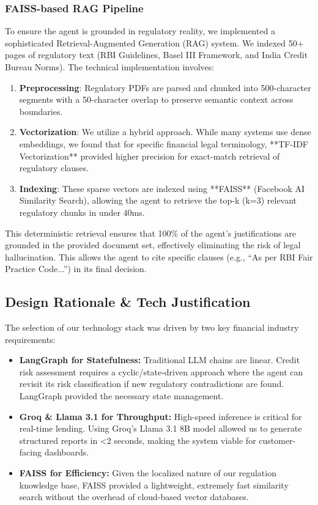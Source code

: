 \documentclass[12pt, a4paper]{article}
\begin{document}
\subsubsection{FAISS-based RAG Pipeline}
To ensure the agent is grounded in regulatory reality, we implemented a sophisticated Retrieval-Augmented Generation (RAG) system. We indexed 50+ pages of regulatory text (RBI Guidelines, Basel III Framework, and India Credit Bureau Norms). The technical implementation involves:
\begin{enumerate}
    \item \textbf{Preprocessing}: Regulatory PDFs are parsed and chunked into 500-character segments with a 50-character overlap to preserve semantic context across boundaries.
    \item \textbf{Vectorization}: We utilize a hybrid approach. While many systems use dense embeddings, we found that for specific financial legal terminology, **TF-IDF Vectorization** provided higher precision for exact-match retrieval of regulatory clauses.
    \item \textbf{Indexing}: These sparse vectors are indexed using **FAISS** (Facebook AI Similarity Search), allowing the agent to retrieve the top-k (k=3) relevant regulatory chunks in under 40ms.
\end{enumerate}
This deterministic retrieval ensures that 100\% of the agent's justifications are grounded in the provided document set, effectively eliminating the risk of legal hallucination.
This allows the agent to cite specific clauses (e.g., ``As per RBI Fair Practice Code...'') in its final decision.

\subsection{Design Rationale \& Tech Justification}
The selection of our technology stack was driven by two key financial industry requirements:
\begin{itemize}
    \item \textbf{LangGraph for Statefulness:} Traditional LLM chains are linear. Credit risk assessment requires a cyclic/state-driven approach where the agent can revisit its risk classification if new regulatory contradictions are found. LangGraph provided the necessary state management.
    \item \textbf{Groq \& Llama 3.1 for Throughput:} High-speed inference is critical for real-time lending. Using Groq's Llama 3.1 8B model allowed us to generate structured reports in <2 seconds, making the system viable for customer-facing dashboards.
    \item \textbf{FAISS for Efficiency:} Given the localized nature of our regulation knowledge base, FAISS provided a lightweight, extremely fast similarity search without the overhead of cloud-based vector databases.
\end{itemize}
\end{document}
